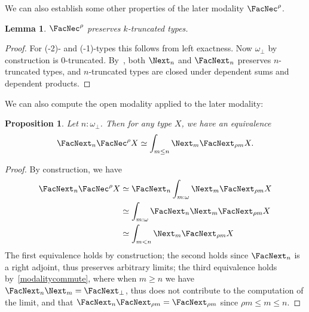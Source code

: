 \documentclass[a4paper,10pt]{amsart}
\newtheorem{theorem}{Theorem}[section]
\newtheorem{lemma}{Lemma}[section]
\newtheorem{proposition}{Proposition}[section]
\theoremstyle{definition}
\newcommand{\ms}[1]{\mathsf{#1}}
\newcommand{\ass}[1]{\OpnBrktBar#1\ClsBrktBar}
\newcommand{\ovob}{\omega_\bot}
\newcommand{\bx}{\FacNec}
\newcommand{\Type}{\ms U}
\newcommand{\apd}{\ms{apd}}
\newcommand{\opm}[1]{\FacNext_{#1}}
\newcommand{\clm}[1]{\Next_{#1}}
\newcommand{\fix}{\ms{fix}}
\begin{document}


We can also establish some other properties of the later modality $\bx^\rho$.

\begin{lemma}\label{preservetruncation}
  $\bx^\rho$ preserves $k$-truncated types.
\end{lemma}
\begin{proof}
  For (-2)- and (-1)-types this follows from left exactness. Now $\omega_\bot$ by construction is 0-truncated. By~\cite{lmcs:3826}, both $\clm n$ and $\opm n$ preserves $n$-truncated types, and $n$-truncated types are closed under dependent sums and dependent products.
\end{proof}

We can also compute the open modality applied to the later modality:

\begin{proposition}\label{openoflater}
  Let $n:\ovob$. Then for any type $X$, we have an equivalence
  \[ \opm n\bx^\rho X \simeq \int_{m\le n}\clm m\opm{\rho m}X. \]
\end{proposition}
\begin{proof}
  By construction, we have 
  \begin{align*}
    \opm n\bx^\rho X 
    &\simeq \opm n\int_{m:\omega} \clm m\opm{\rho m} X \\
    &\simeq \int_{m:\omega}\opm n\clm m\opm{\rho m} X \\ 
    &\simeq \int_{m<n}\clm m\opm{\rho m}X
  \end{align*}
  The first equivalence holds by construction; the second holds since $\opm n$ is a right adjoint, thus preserves arbitrary limits; the third equivalence holds by~\cref{modalitycommute}, where when $m \ge n$ we have $\opm n\clm m = \opm{\bot}$, thus does not contribute to the computation of the limit, and that $\opm n\opm{\rho m} = \opm{\rho m}$ since $\rho m \le m \le n$. 
\end{proof}
\end{document}
